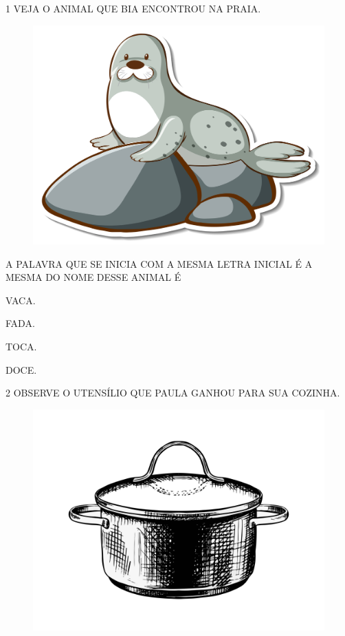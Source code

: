 
\num{1} VEJA O ANIMAL QUE BIA ENCONTROU NA PRAIA.

\begin{figure}[H]
\centering
\includegraphics[width=.6\textwidth]{./media/image210.jpg}
\end{figure}

A PALAVRA QUE SE INICIA COM A MESMA LETRA INICIAL É A MESMA DO NOME DESSE ANIMAL É

\begin{escolha}

\item VACA.

\item FADA.

\item TOCA.

\item DOCE.

\end{escolha}

\num{2} OBSERVE O UTENSÍLIO QUE PAULA GANHOU PARA SUA COZINHA.

\begin{figure}[H]
\centering
\includegraphics[width=.6\textwidth]{./media/image211.jpg}
\end{figure}

